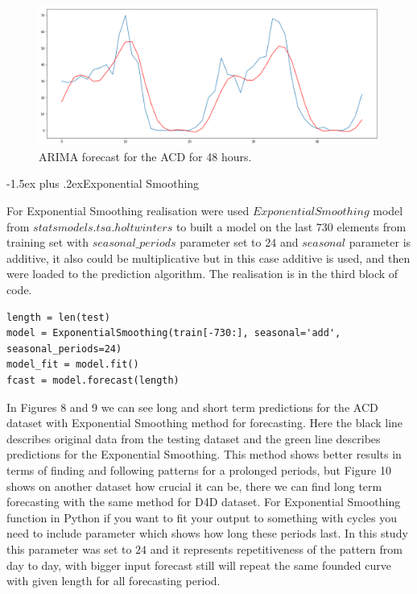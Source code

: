 \documentclass[12pt,a4paper]{article}
\makeatletter
\renewcommand{\subsection}{\@startsection{subsection}{2}{18pt}{3.25ex plus 1ex minus 0.2ex}%
{-1.5ex plus .2ex}{\bfseries\rmfamily\large}}
\theoremstyle{myplain}
\numberwithin{equation}{section}
\makeatother
\begin{document}
\begin{figure}
\includegraphics[scale=0.36]{ACD_ARIMA_short_plot}
\caption{ARIMA forecast for the ACD for 48 hours.}
\end{figure}

\subsection{Exponential Smoothing}

For Exponential Smoothing realisation were used $ExponentialSmoothing$ model from $statsmodels.tsa.holtwinters$ to built a model on the last $730$ elements from training set with $seasonal\_periods$ parameter set to $24$ and $seasonal$ parameter is additive, it also could be multiplicative but in this case additive is used, and then were loaded to the prediction algorithm. The realisation is in the third block of code.

\begin{lstlisting}
length = len(test)
model = ExponentialSmoothing(train[-730:], seasonal='add', seasonal_periods=24)
model_fit = model.fit()
fcast = model.forecast(length)
\end{lstlisting}

In Figures 8 and 9 we can see long and short term predictions for the ACD dataset with Exponential Smoothing method for forecasting. Here the black line describes original data from the testing dataset and the green line describes predictions for the Exponential Smoothing. This method shows better results in terms of finding and following patterns for a prolonged periods, but Figure 10 shows on another dataset how crucial it can be, there we can find long term forecasting with the same method for D4D dataset. For Exponential Smoothing function in Python if you want to fit your output to something with cycles you need to include parameter which shows how long these periods last. In this study this parameter was set to $24$ and it represents repetitiveness of the pattern from day to day, with bigger input forecast still will repeat the same founded curve with given length for all forecasting period.
\end{document}
